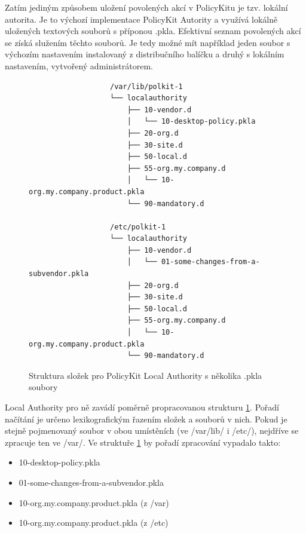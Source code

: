 Zatím jediným způsobem uložení povolených akcí v PolicyKitu je tzv. lokální
autorita. Je to výchozí implementace PolicyKit Autority a využívá lokálně
uložených textových souborů s příponou .pkla. Efektivní seznam povolených akcí
se získá služením těchto souborů. Je tedy možné mít například jeden soubor
s výchozím nastavením instalovaný z distribučního balíčku a druhý s lokálním
nastavením, vytvořený administrátorem.

\begin{figure}[h]
    \centering
    \begin{verbatim}
                   /var/lib/polkit-1
                   └── localauthority
                       ├── 10-vendor.d
                       │   └── 10-desktop-policy.pkla
                       ├── 20-org.d
                       ├── 30-site.d
                       ├── 50-local.d
                       ├── 55-org.my.company.d
                       │   └── 10-org.my.company.product.pkla
                       └── 90-mandatory.d

                   /etc/polkit-1
                   └── localauthority
                       ├── 10-vendor.d
                       │   └── 01-some-changes-from-a-subvendor.pkla
                       ├── 20-org.d
                       ├── 30-site.d
                       ├── 50-local.d
                       ├── 55-org.my.company.d
                       │   └── 10-org.my.company.product.pkla
                       └── 90-mandatory.d
    \end{verbatim}
    \caption{Struktura složek pro PolicyKit Local Authority s několika .pkla soubory}
    \label{fig:pkit_la}
\end{figure}

Local Authority pro ně zavádí poměrně propracovanou strukturu \ref{fig:pkit_la}.
Pořadí načítání je určeno lexikografickým řazením složek a souborů v nich.
Pokud je stejně pojmenovaný soubor v obou umístěních (ve /var/lib/ i /etc/),
nejdříve se zpracuje ten ve /var/.
Ve struktuře \ref{fig:pkit_la} by pořadí zpracování vypadalo takto:
\begin{itemize}
\item 10-desktop-policy.pkla
\item 01-some-changes-from-a-subvendor.pkla
\item 10-org.my.company.product.pkla (z /var)
\item 10-org.my.company.product.pkla (z /etc)
\end{itemize}

